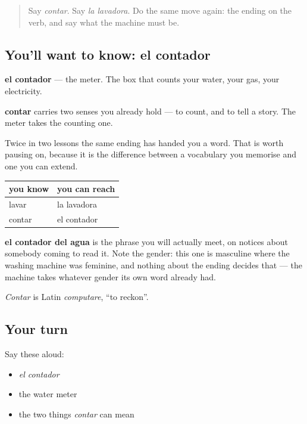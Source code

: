 \begin{quote}
Say \emph{contar}. Say \emph{la lavadora}. Do the same move again: the ending on the verb, and say what the machine must be.
\end{quote}

\subsection*{You'll want to know: el contador}
\textbf{el contador} — the meter. The box that counts your water, your gas, your electricity.

\textbf{contar} carries two senses you already hold — to count, and to tell a story. The meter takes the counting one.

\begin{cousinweb}
Twice in two lessons the same ending has handed you a word. That is worth pausing on, because it is the difference between a vocabulary you memorise and one you can extend.

\noindent
\begin{tabularx}{\linewidth}{@{}>{\raggedright\arraybackslash}X>{\raggedright\arraybackslash}X@{}}
\toprule
\textbf{you know} & \textbf{you can reach} \\
\midrule
lavar & la lavadora \\
contar & el contador \\
\bottomrule
\end{tabularx}

\textbf{el contador del agua} is the phrase you will actually meet, on notices about somebody coming to read it. Note the gender: this one is masculine where the washing machine was feminine, and nothing about the ending decides that — the machine takes whatever gender its own word already had.

\emph{Contar} is Latin \emph{computare}, \textquotedblleft{}to reckon\textquotedblright{}.
\end{cousinweb}

\subsection*{Your turn}
Say these aloud:

\begin{itemize}
\raggedright
  \item \emph{el contador}
  \item the water meter
  \item the two things \emph{contar} can mean
\end{itemize}

